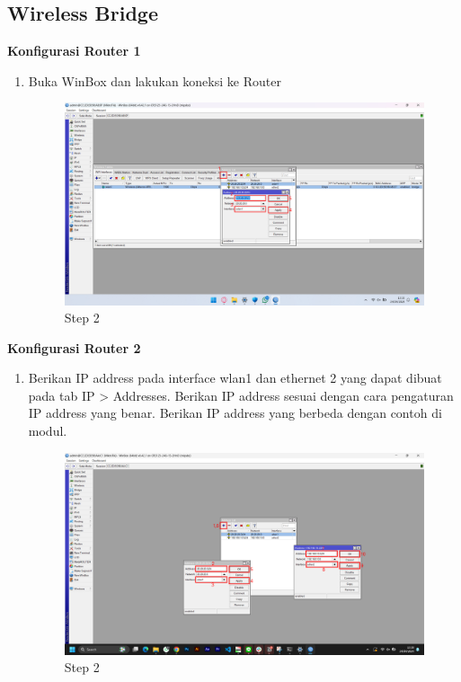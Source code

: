 \subsection{Wireless Bridge}
\begin{center}

	\textbf{Konfigurasi Router 1}
	\begin{enumerate}
		\item Buka WinBox dan lakukan koneksi ke Router
		      \begin{figure}[H]
			      \centering
			      \includegraphics[width=0.9\linewidth]{P1/img/per3/pc1/Step 2.png}
			      \caption{Step 2}
			      \label{fig:Step 2(Per.3 PC1)}
		      \end{figure}
	\end{enumerate}

	\textbf{Konfigurasi Router 2}
	\begin{enumerate}
		\item Berikan IP address pada interface wlan1 dan ethernet 2 yang dapat dibuat pada tab IP > Addresses. Berikan IP address sesuai dengan cara pengaturan IP address yang benar. Berikan IP address yang berbeda dengan contoh di modul.
		      \begin{figure}[H]
			      \centering
			      \includegraphics[width=0.9\linewidth]{P1/img/per3/pc2/Step 2.png}
			      \caption{Step 2}
			      \label{fig:Step 2(Per.3 PC2)}
		      \end{figure}
	\end{enumerate}


\end{center}
